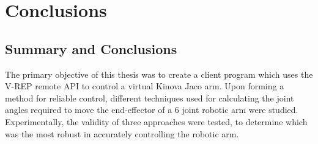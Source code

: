 \documentclass[12pt,openany,a4paper]{book}
\renewcommand{\baselinestretch}{1.2}	%
\newcommand{\tab}[1]  {Table~\ref{#1}}		%
\begin{document}
%
%
%
%
%
%
%

\chapter{Conclusions}
\section{Summary and Conclusions}
The primary objective of this thesis was to create a client program which uses the V-REP remote API to control a virtual Kinova Jaco arm. Upon forming a method for reliable control, different techniques used for calculating the joint angles required to move the end-effector of a 6 joint robotic arm were studied. Experimentally, the validity of three approaches were tested, to determine which was the most robust in accurately controlling the robotic arm. \\
\end{document}
